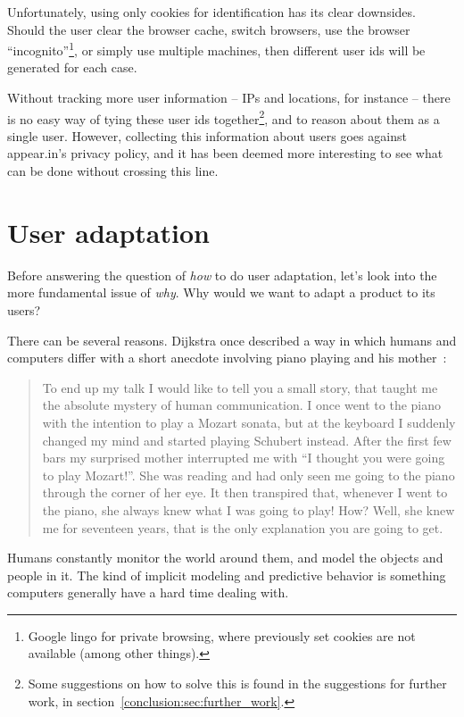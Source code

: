 Unfortunately, using only cookies for identification has its clear downsides. Should the user clear the browser cache, switch browsers, use the browser ``incognito''\footnote{Google lingo for private browsing, where previously set cookies are not available (among other things).}, or simply use multiple machines, then different user ids will be generated for each case.

Without tracking more user information -- IPs and locations, for instance -- there is no easy way of tying these user ids together\footnote{Some suggestions on how to solve this is found in the suggestions for further work, in section~\ref{conclusion:sec:further_work}.}, and to reason about them as a single user. However, collecting this information about users goes against appear.in's privacy policy, and it has been deemed more interesting to see what can be done without crossing this line.

\section{User adaptation}
\label{intro:sec:adaptation}

Before answering the question of \emph{how} to do user adaptation, let's look into the more fundamental issue of \emph{why}. Why would we want to adapt a product to its users?

There can be several reasons. Dijkstra once described a way in which humans and computers differ with a short anecdote involving piano playing and his mother~\cite{Dijkstra1982}:

\begin{quote}
    To end up my talk I would like to tell you a small story, that taught me the absolute mystery of human communication. I once went to the piano with the intention to play a Mozart sonata, but at the keyboard I suddenly changed my mind and started playing Schubert instead. After the first few bars my surprised mother interrupted me with ``I thought you were going to play Mozart!''. She was reading and had only seen me going to the piano through the corner of her eye. It then transpired that, whenever I went to the piano, she always knew what I was going to play! How? Well, she knew me for seventeen years, that is the only explanation you are going to get.
\end{quote}

Humans constantly monitor the world around them, and model the objects and people in it. The kind of implicit modeling and predictive behavior is something computers generally have a hard time dealing with.

